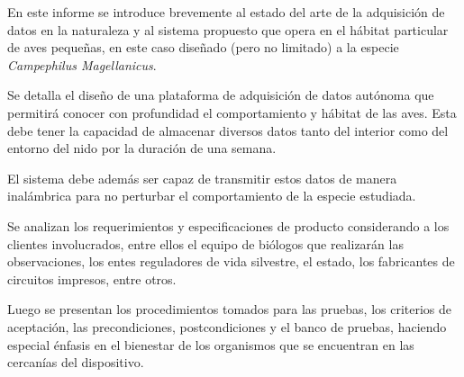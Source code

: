%

%

En este informe se introduce brevemente al estado del arte de la adquisición de datos en la naturaleza y al sistema propuesto que opera en el hábitat particular de aves pequeñas, en este caso diseñado (pero no limitado) a la especie \textit{Campephilus Magellanicus}. 

Se detalla el diseño de una plataforma de adquisición de datos autónoma que permitirá conocer con profundidad el comportamiento y hábitat de las aves. Esta debe tener la capacidad de almacenar diversos datos tanto del interior como del entorno del nido por la duración de una semana.

El sistema debe además ser capaz de transmitir estos datos de manera inalámbrica para no perturbar el comportamiento de la especie estudiada.

Se analizan los requerimientos y especificaciones de producto considerando a los clientes involucrados, entre ellos el equipo de biólogos que realizarán las observaciones, los entes reguladores de vida silvestre, el estado, los fabricantes de circuitos impresos, entre otros.

Luego se presentan los procedimientos tomados para las pruebas, los criterios de aceptación, las precondiciones, postcondiciones y el banco de pruebas, haciendo especial énfasis en el bienestar de los organismos que se encuentran en las cercanías del dispositivo.\\
\TBC
{}
%
